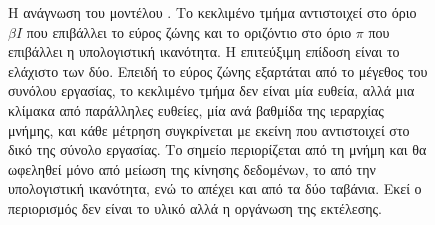 \begin{figure}[H]
\begin{tikzpicture}[x=1.35cm, y=0.85cm]
    \end{tikzpicture}
    \caption[Η ανάγνωση του μοντέλου ]{Η ανάγνωση του μοντέλου . Το κεκλιμένο τμήμα αντιστοιχεί
    στο όριο $\beta I$ που επιβάλλει το εύρος ζώνης και το οριζόντιο στο όριο $\pi$
    που επιβάλλει η υπολογιστική ικανότητα. Η επιτεύξιμη επίδοση είναι το ελάχιστο
    των δύο. Επειδή το εύρος ζώνης εξαρτάται από το μέγεθος του συνόλου εργασίας,
    το κεκλιμένο τμήμα δεν είναι μία ευθεία, αλλά μια κλίμακα από παράλληλες
    ευθείες, μία ανά βαθμίδα της ιεραρχίας μνήμης, και κάθε μέτρηση συγκρίνεται με
    εκείνη που αντιστοιχεί στο δικό της σύνολο εργασίας. Το σημείο 
    περιορίζεται από τη μνήμη και θα ωφεληθεί μόνο από μείωση της κίνησης
    δεδομένων, το  από την υπολογιστική ικανότητα, ενώ το  απέχει και
    από τα δύο ταβάνια. Εκεί ο περιορισμός δεν είναι το υλικό αλλά η οργάνωση της
    εκτέλεσης.}
    \label{fig:meth-roofline}
\end{figure}
